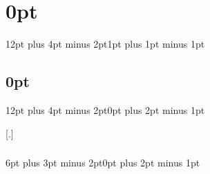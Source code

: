 \titlespacing\section{0pt}{12pt plus 4pt minus 2pt}{1pt plus 1pt minus 1pt}

\titleformat{\subsection}{\bfseries\sffamily\raggedright}{\thesubsection}{0.5em}{}
\titlespacing\subsection{0pt}{12pt plus 4pt minus 2pt}{0pt plus 2pt minus 1pt}

\titleformat{\subsubsection}[runin]{\bfseries\sffamily}{\thesubsubsection}{0.5em}{}[.\hspace*{0.5em}]
\titlespacing\subsubsection{\parindent}{6pt plus 3pt minus 2pt}{0pt plus 2pt minus 1pt}


\usepackage{fancyhdr}              %
\pagestyle{fancy}                  %
\fancyhf{}                         %
\fancyfoot[C]{\thepage}            %
\renewcommand{\footrulewidth}{1pt} %
\renewcommand{\headrulewidth}{0pt} %


\usepackage{biblatex}                       %

